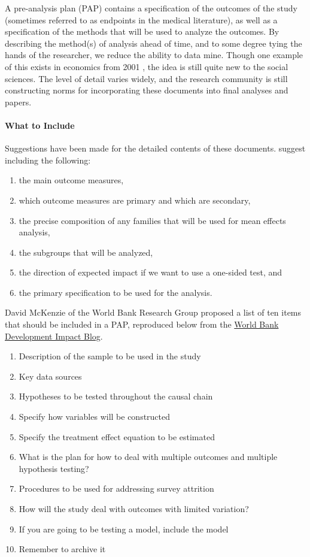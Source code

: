 \documentclass[12pt] {article}
\begin{document}
A pre-analysis plan (PAP) contains a specification of the outcomes of the study (sometimes referred to as endpoints in the medical literature), as well as a specification of the methods that will be used to analyze the outcomes. By describing the
method(s) of analysis ahead of time, and to some degree tying the hands
of the researcher, we reduce the ability to data mine. Though one
example of this exists in economics from 2001 \citep{neumark_employment_2001}, the idea
is still quite new to the social sciences. The level of detail varies
widely, and the research community is still constructing norms for
incorporating these documents into final analyses and papers.

\paragraph{What to Include}
Suggestions have been made for the detailed contents of these documents.
\cite{glennerster_running_2013} suggest including the following:

\begin{enumerate}
\def\labelenumi{\arabic{enumi}.}
\item
  the main outcome measures,
\item
  which outcome measures are primary and which are secondary,
\item
  the precise composition of any families that will be used for mean
  effects analysis,
\item
  the subgroups that will be analyzed,
\item
  the direction of expected impact if we want to use a one-sided test,
  and
\item
  the primary specification to be used for the analysis.
\end{enumerate}
David McKenzie of the World Bank Research Group proposed a list of ten
items that should be included in a PAP, reproduced below from the \href{http://blogs.worldbank.org/impactevaluations/a-pre-analysis-plan-checklist}{World Bank Development Impact Blog}.

\begin{enumerate}
\item
  Description of the sample to be used in the study
\item
  Key data sources
\item
  Hypotheses to be tested throughout the causal chain
\item
  Specify how variables will be constructed
\item
  Specify the treatment effect equation to be estimated
\item
  What is the plan for how to deal with multiple outcomes and multiple
  hypothesis testing?
\item
  Procedures to be used for addressing survey attrition
\item
  How will the study deal with outcomes with limited variation?
\item
  If you are going to be testing a model, include the model
\item
  Remember to archive it
\end{enumerate}
\end{document}
